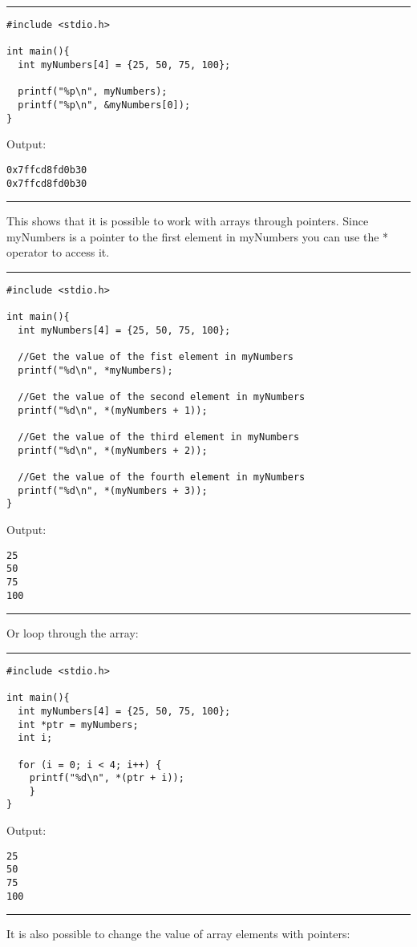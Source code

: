 \documentclass[a4paper]{article}
\begin{document}
\noindent\rule{\textwidth}{0.5pt}
\begin{verbatim}
#include <stdio.h>

int main(){
  int myNumbers[4] = {25, 50, 75, 100};

  printf("%p\n", myNumbers);
  printf("%p\n", &myNumbers[0]);
}
\end{verbatim}
Output:
\begin{verbatim}
0x7ffcd8fd0b30
0x7ffcd8fd0b30
\end{verbatim}

\noindent\rule{\textwidth}{0.5pt}
This shows that it is possible to work with arrays through pointers.
Since myNumbers is a pointer to the first element in myNumbers you can use the *
operator to access it.

\noindent\rule{\textwidth}{0.5pt}
\begin{verbatim}
#include <stdio.h>

int main(){
  int myNumbers[4] = {25, 50, 75, 100};

  //Get the value of the fist element in myNumbers
  printf("%d\n", *myNumbers);

  //Get the value of the second element in myNumbers
  printf("%d\n", *(myNumbers + 1));

  //Get the value of the third element in myNumbers
  printf("%d\n", *(myNumbers + 2));

  //Get the value of the fourth element in myNumbers
  printf("%d\n", *(myNumbers + 3));
}
\end{verbatim}
Output:
\begin{verbatim}
25
50
75
100
\end{verbatim}

\noindent\rule{\textwidth}{0.5pt}
Or loop through the array:

\noindent\rule{\textwidth}{0.5pt}
\begin{verbatim}
#include <stdio.h>

int main(){
  int myNumbers[4] = {25, 50, 75, 100};
  int *ptr = myNumbers;
  int i;

  for (i = 0; i < 4; i++) {
    printf("%d\n", *(ptr + i));
    }
}
\end{verbatim}
Output:
\begin{verbatim}
25
50
75
100
\end{verbatim}

\noindent\rule{\textwidth}{0.5pt}
It is also possible to change the value of array elements with pointers:
\end{document}
